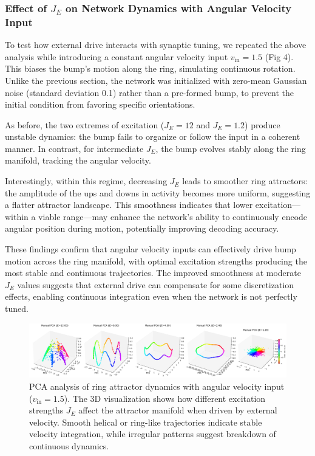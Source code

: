 \documentclass[11pt,a4paper]{article}
\begin{document}
\subsubsection*{Effect of \( J_E \) on Network Dynamics with Angular Velocity Input}

To test how external drive interacts with synaptic tuning, we repeated the above analysis while introducing a constant angular velocity input \( v_{\text{in}} = 1.5 \) (Fig 4). This biases the bump’s motion along the ring, simulating continuous rotation. Unlike the previous section, the network was initialized with zero-mean Gaussian noise (standard deviation 0.1) rather than a pre-formed bump, to prevent the initial condition from favoring specific orientations.

As before, the two extremes of excitation (\( J_E = 12 \) and \( J_E = 1.2 \)) produce unstable dynamics: the bump fails to organize or follow the input in a coherent manner. In contrast, for intermediate \( J_E \), the bump evolves stably along the ring manifold, tracking the angular velocity.

Interestingly, within this regime, decreasing \( J_E \) leads to smoother ring attractors: the amplitude of the ups and downs in activity becomes more uniform, suggesting a flatter attractor landscape. This smoothness indicates that lower excitation—within a viable range—may enhance the network’s ability to continuously encode angular position during motion, potentially improving decoding accuracy.

These findings confirm that angular velocity inputs can effectively drive bump motion across the ring manifold, with optimal excitation strengths producing the most stable and continuous trajectories. The improved smoothness at moderate \( J_E \) values suggests that external drive can compensate for some discretization effects, enabling continuous integration even when the network is not perfectly tuned.

\begin{figure}[H]
\centering
\includegraphics[width=1.0\textwidth]{manual_pca_with_v.png}
\caption{PCA analysis of ring attractor dynamics with angular velocity input (\( v_{\text{in}} = 1.5 \)). The 3D visualization shows how different excitation strengths \( J_E \) affect the attractor manifold when driven by external velocity. Smooth helical or ring-like trajectories indicate stable velocity integration, while irregular patterns suggest breakdown of continuous dynamics.}
\label{fig:pca_with_velocity}
\end{figure}
\end{document}

